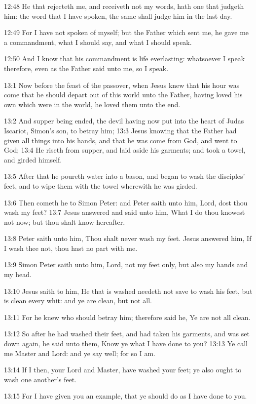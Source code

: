 12:48 He that rejecteth me, and receiveth not my words, hath one that
judgeth him: the word that I have spoken, the same shall judge him in
the last day.

12:49 For I have not spoken of myself; but the Father which sent me,
he gave me a commandment, what I should say, and what I should speak.

12:50 And I know that his commandment is life everlasting: whatsoever
I speak therefore, even as the Father said unto me, so I speak.

13:1 Now before the feast of the passover, when Jesus knew that his
hour was come that he should depart out of this world unto the Father,
having loved his own which were in the world, he loved them unto the
end.

13:2 And supper being ended, the devil having now put into the heart
of Judas Iscariot, Simon's son, to betray him; 13:3 Jesus knowing that
the Father had given all things into his hands, and that he was come
from God, and went to God; 13:4 He riseth from supper, and laid aside
his garments; and took a towel, and girded himself.

13:5 After that he poureth water into a bason, and began to wash the
disciples' feet, and to wipe them with the towel wherewith he was
girded.

13:6 Then cometh he to Simon Peter: and Peter saith unto him, Lord,
dost thou wash my feet?  13:7 Jesus answered and said unto him, What I
do thou knowest not now; but thou shalt know hereafter.

13:8 Peter saith unto him, Thou shalt never wash my feet. Jesus
answered him, If I wash thee not, thou hast no part with me.

13:9 Simon Peter saith unto him, Lord, not my feet only, but also my
hands and my head.

13:10 Jesus saith to him, He that is washed needeth not save to wash
his feet, but is clean every whit: and ye are clean, but not all.

13:11 For he knew who should betray him; therefore said he, Ye are not
all clean.

13:12 So after he had washed their feet, and had taken his garments,
and was set down again, he said unto them, Know ye what I have done to
you?  13:13 Ye call me Master and Lord: and ye say well; for so I am.

13:14 If I then, your Lord and Master, have washed your feet; ye also
ought to wash one another's feet.

13:15 For I have given you an example, that ye should do as I have
done to you.

